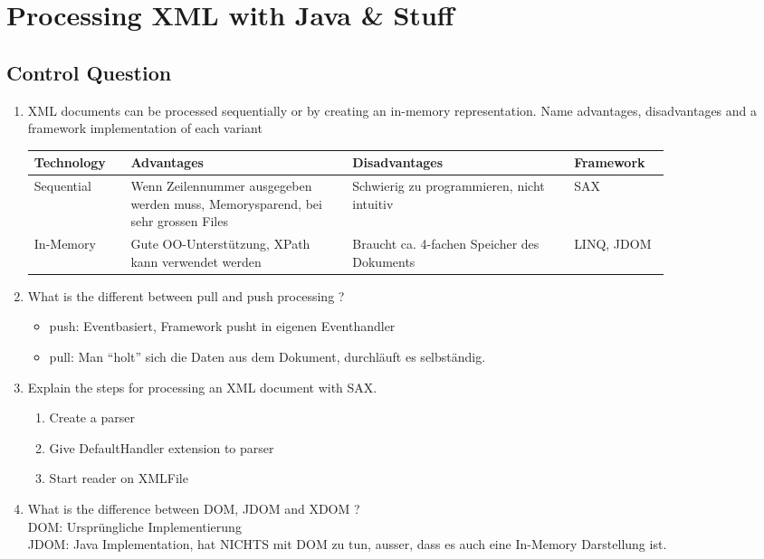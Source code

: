 \chapter{Processing XML with Java \& Stuff}
\section{Control Question}
\begin{enumerate}
\item XML documents can be processed sequentially or by creating an in-memory representation. Name advantages, disadvantages and a framework implementation of each variant\\

\begin{tabular}{|p{0.12\linewidth}|p{0.3\linewidth}|p{0.3\linewidth}|p{0.12\linewidth}|}
\hline
Technology & Advantages & Disadvantages & Framework\\
\hline
Sequential & Wenn Zeilennummer ausgegeben werden muss, Memorysparend, bei sehr grossen Files & Schwierig zu programmieren, nicht intuitiv & SAX\\
\hline
In-Memory & Gute OO-Unterstützung, XPath kann verwendet werden & Braucht ca. 4-fachen Speicher des Dokuments & LINQ, JDOM\\
\hline
\end{tabular}
\item What is the different between pull and push processing ?\\
\begin{itemize}
\item push: Eventbasiert, Framework pusht in eigenen Eventhandler
\item pull: Man "`holt"' sich die Daten aus dem Dokument, durchläuft es selbständig.
\end{itemize}
\item Explain the steps for processing an XML document with SAX.
\begin{enumerate}
\item Create a parser
\item Give DefaultHandler extension to parser
\item Start reader on XMLFile
\end{enumerate}
\item What is the difference between DOM, JDOM and XDOM ?\\
DOM: Ursprüngliche Implementierung\\
JDOM: Java Implementation, hat NICHTS mit DOM zu tun, ausser, dass es auch eine In-Memory Darstellung ist.\\

\end{enumerate}
